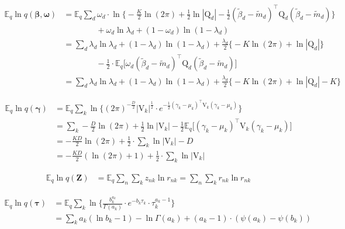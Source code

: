 \documentclass[twoside,11pt]{article}
\newcommand{\transpose}[1]{#1^{\intercal}}
\newcommand{\nsum}{\sum\limits_{n}}
\newcommand{\ksum}{\sum\limits_{k}}
\newcommand{\boldbeta}{\boldsymbol\beta}
\newcommand{\boldgamma}{\boldsymbol\gamma}
\newcommand{\boldomega}{\boldsymbol\omega}
\newcommand{\boldtau}{\boldsymbol\tau}
\newcommand{\E}{\mathbb{E}}
\newcommand{\betad}{\tilde{\beta}_d}
\newcommand{\qmat}{\mathrm{Q}}
\begin{document}
\begin{align*}
	\E_q \ln q\left( \boldbeta, \boldomega \right) &=  \E_q \sum_d \omega_d \cdot \ln \Big\{ -\frac{K}{2} \ln (2\pi) + \frac{1}{2} \ln |\qmat_d | - \frac{1}{2} \transpose{\left( \betad - \tilde{m}_d \right)} \qmat_d \left( \betad - \tilde{m}_d \right) \Big\} \\
	& \qquad \qquad  + \omega_d \ln \lambda_d + (1 - \omega_d) \ln (1 - \lambda_d) \\
	&= \sum_d \lambda_d \ln \lambda_d + (1 - \lambda_d) \ln (1-\lambda_d) + \frac{\lambda_d}{2} \Big\{ - K \ln (2\pi) + \ln |\qmat_d|\Big\} \\
	& \qquad \qquad  - \frac{1}{2} \cdot \E_q \Big[ \omega_d \transpose{\left( \betad - \tilde{m}_d \right)} \qmat_d \left( \betad - \tilde{m}_d \right) \Big] \\
	&= \sum_d \lambda_d \ln \lambda_d + (1 - \lambda_d) \ln (1-\lambda_d) + \frac{\lambda_d}{2} \Big\{ - K \ln (2\pi) + \ln |\qmat_d| - K\Big\}
\end{align*}

\begin{align*}
	\E_q \ln q\left( \boldgamma \right) &= \E_q \ksum \ln \Big\{ (2\pi)^{-\frac{D}{2}} |\mathrm{V}_k|^{\frac{1}{2}} \cdot e^{-\frac{1}{2} \transpose{(\gamma_k	- \mu_k)} \mathrm{V}_k (\gamma_k - \mu_k)}\Big\}\\
	&= \ksum -\frac{D}{2} \ln (2\pi) + \frac{1}{2} \ln |\mathrm{V}_k|  -\frac{1}{2} \E_q \Big[ \transpose{(\gamma_k - \mu_k)} \mathrm{V}_k (\gamma_k- \mu_k)\Big] \\
	&= -\frac{KD}{2} \ln (2\pi) + \frac{1}{2} \cdot \ksum \ln |\mathrm{V}_k| - D \\
	&= - \frac{KD}{2} \left( \ln(2\pi) + 1 \right) + \frac{1}{2} \cdot \ksum \ln |\mathrm{V}_k|
\end{align*}

\begin{align*}
	\E_q \ln q\left( \mathbf{Z} \right) &= \E_q \nsum \ksum z_{nk} \ln r_{nk} = \nsum \ksum r_{nk} \ln r_{nk}
\end{align*}

\begin{align*}
	\E_q \ln q\left( \boldtau \right) &= \E_q \ksum \ln \Bigg\{ \frac{b_k^{a_k}}{\Gamma(a_k)} \cdot  e^{-b_k \tau_k} \cdot  \tau_k^{a_k - 1}\Bigg\}\\
	&= \ksum a_k \left( \ln b_k - 1 \right) - \ln \Gamma(a_k)  + (a_k - 1) \cdot \left( \psi(a_k) - \psi(b_k) \right)
\end{align*}



\vskip 0.2in
\printbibliography
\end{document}
